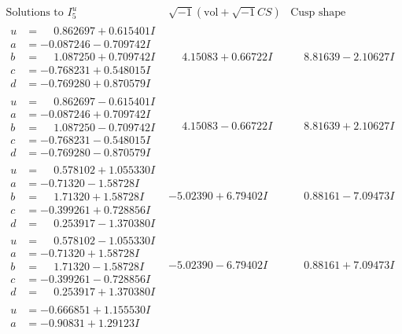\documentclass[1p]{elsarticle_modified}
\theoremstyle{definition}
\newcommand{\I}{\sqrt{-1}}
\begin{document}
$$\begin{array}{c|c|c}  
\text{Solutions to }I^u_{5}& \I (\text{vol} + \sqrt{-1}CS) & \text{Cusp shape}\\
 \hline 
\begin{aligned}
u &= \phantom{-}0.862697 + 0.615401 I \\
a &= -0.087246 - 0.709742 I \\
b &= \phantom{-}1.087250 + 0.709742 I \\
c &= -0.768231 + 0.548015 I \\
d &= -0.769280 + 0.870579 I\end{aligned}
 & \phantom{-}4.15083 + 0.66722 I & \phantom{-}8.81639 - 2.10627 I \\ \hline\begin{aligned}
u &= \phantom{-}0.862697 - 0.615401 I \\
a &= -0.087246 + 0.709742 I \\
b &= \phantom{-}1.087250 - 0.709742 I \\
c &= -0.768231 - 0.548015 I \\
d &= -0.769280 - 0.870579 I\end{aligned}
 & \phantom{-}4.15083 - 0.66722 I & \phantom{-}8.81639 + 2.10627 I \\ \hline\begin{aligned}
u &= \phantom{-}0.578102 + 1.055330 I \\
a &= -0.71320 - 1.58728 I \\
b &= \phantom{-}1.71320 + 1.58728 I \\
c &= -0.399261 + 0.728856 I \\
d &= \phantom{-}0.253917 - 1.370380 I\end{aligned}
 & -5.02390 + 6.79402 I & \phantom{-}0.88161 - 7.09473 I \\ \hline\begin{aligned}
u &= \phantom{-}0.578102 - 1.055330 I \\
a &= -0.71320 + 1.58728 I \\
b &= \phantom{-}1.71320 - 1.58728 I \\
c &= -0.399261 - 0.728856 I \\
d &= \phantom{-}0.253917 + 1.370380 I\end{aligned}
 & -5.02390 - 6.79402 I & \phantom{-}0.88161 + 7.09473 I \\ \hline\begin{aligned}
u &= -0.666851 + 1.155530 I \\
a &= -0.90831 + 1.29123 I \\

\end{aligned}
\end{array}$$
\end{document}

